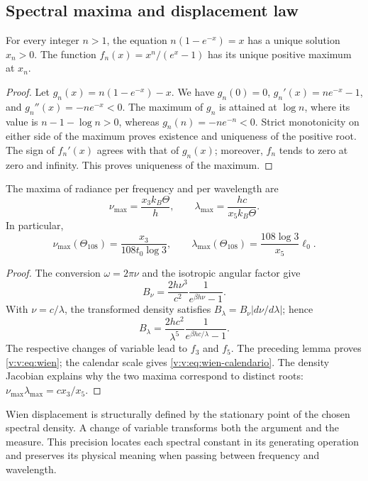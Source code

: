 \newpage
\subsection{Spectral maxima and displacement law}

\begin{lemma}
\label{v:v:lem:raiz-wien}
For every integer \(n>1\), the equation
\(n(1-e^{-x})=x\) has a unique solution \(x_n>0\).
The function \(f_n(x)=x^n/(e^x-1)\) has its unique positive maximum at
\(x_n\).
\end{lemma}
\begin{proof}
Let \(g_n(x)=n(1-e^{-x})-x\). We have
\(g_n(0)=0\), \(g_n'(x)=ne^{-x}-1\), and
\(g_n''(x)=-ne^{-x}<0\). The maximum of \(g_n\) is attained at
\(\log n\), where its value is \(n-1-\log n>0\), whereas
\(g_n(n)=-ne^{-n}<0\). Strict monotonicity on either side of the maximum
proves existence and uniqueness of the positive root. The sign of
\(f_n'(x)\) agrees with that of \(g_n(x)\); moreover, \(f_n\) tends
to zero at zero and infinity. This proves uniqueness of the maximum.
\end{proof}

\begin{proposition}
\label{v:v:prop:wien}
The maxima of radiance per frequency and per wavelength are
\begin{equation}
 \nu_{\max}=\frac{x_3 k_B\Theta}{h},\qquad
 \lambda_{\max}=\frac{hc}{x_5 k_B\Theta}.
 \label{v:v:eq:wien}
\end{equation}
In particular,
\begin{equation}
 \nu_{\max}(\Theta_{108})=
 \frac{x_3}{108t_0\log3},\qquad
 \lambda_{\max}(\Theta_{108})=
 \frac{108\log3}{x_5}\ell_0.
 \label{v:v:eq:wien-calendario}
\end{equation}
\end{proposition}
\begin{proof}
The conversion \(\omega=2\pi\nu\) and the isotropic angular factor give
\[
 B_\nu=\frac{2h\nu^3}{c^2}\frac1{e^{\beta h\nu}-1}.
\]
With \(\nu=c/\lambda\), the transformed density satisfies
\(B_\lambda=B_\nu|d\nu/d\lambda|\); hence
\[
 B_\lambda=\frac{2hc^2}{\lambda^5}
 \frac1{e^{\beta hc/\lambda}-1}.
\]
The respective changes of variable lead to \(f_3\) and \(f_5\).
The preceding lemma proves \eqref{v:v:eq:wien}; the calendar scale
gives \eqref{v:v:eq:wien-calendario}. The density Jacobian explains why
the two maxima correspond to distinct roots:
\(\nu_{\max}\lambda_{\max}=c x_3/x_5\).
\end{proof}

Wien displacement is structurally defined by the stationary point of
the chosen spectral density. A change of variable transforms
both the argument and the measure. This precision locates
each spectral constant in its generating operation and preserves its
physical meaning when passing between frequency and wavelength.
